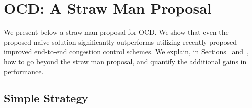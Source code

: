 \documentclass[10pt,sigconf]{acmart}
\begin{document}
\section{OCD: A Straw Man Proposal}\label{sec:straw_man}

We present below a straw man proposal for OCD. We show that even the proposed naive solution significantly outperforms utilizing recently proposed improved end-to-end congestion control schemes. We explain, in Sections~\cite{x} and~\cite{x}, how to go beyond the straw man proposal, and quantify the additional gains in performance.

\subsection{Simple Strategy}


\end{document}
